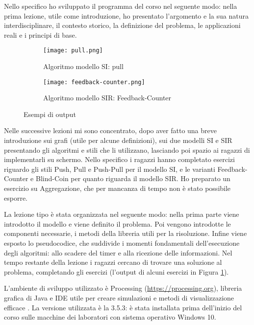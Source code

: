 Nello specifico ho sviluppato il programma del corso nel seguente modo: nella prima lezione, utile come introduzione, ho presentato l’argomento e la sua natura interdisciplinare, il contesto storico, la definizione del problema, le applicazioni reali e i principi di base.
\begin{figure}[!ht]
    
    \begin{subfigure}{.5\textwidth}
        \centering
        \texttt{[image: pull.png]}
        \captionsetup{justification=centering}
        \caption{Algoritmo modello SI: pull} 
    \end{subfigure}\hfill
    \begin{subfigure}{.5\textwidth}
        \centering
        \texttt{[image: feedback-counter.png]}
        \captionsetup{justification=centering}
        \caption{Algoritmo modello SIR: Feedback-Counter} 
    \end{subfigure}
    \caption{Esempi di output}
    \label{fig:output}
\end{figure} 

Nelle successive lezioni mi sono concentrato, dopo aver fatto una breve introduzione sui grafi (utile per alcune definizioni), sui due modelli SI e SIR presentando gli algoritmi e stili che li utilizzano, lasciando poi spazio ai ragazzi di implementarli su schermo. Nello specifico i ragazzi hanno completato esercizi riguardo gli stili Push, Pull e Push-Pull per il modello SI, e le varianti Feedback-Counter e Blind-Coin per quanto riguarda il modello SIR. Ho preparato un esercizio su Aggregazione, che per mancanza di tempo non è stato possibile esporre.

La lezione tipo è stata organizzata nel seguente modo: nella prima parte viene introdotto il modello e viene definito il problema. Poi vengono introdotte le componenti necessarie, i metodi della libreria utili per la risoluzione. Infine viene esposto lo pseudocodice, che suddivide i momenti fondamentali dell'esecuzione degli algoritmi: allo scadere del timer e alla ricezione delle informazioni. Nel tempo restante della lezione i ragazzi cercano di trovare una soluzione al problema, completando gli esercizi (l'output di alcuni esercizi in Figura \ref{fig:output}).

L’ambiente di sviluppo utilizzato è Processing (\href{https://processing.org}{https://processing.org}), libreria grafica di Java e IDE utile per creare simulazioni e metodi di visualizzazione efficace \cite{processing_wikipedia}. La versione utilizzata è la 3.5.3: è stata installata prima dell'inizio del corso sulle macchine dei laboratori con sistema operativo Windows 10.

